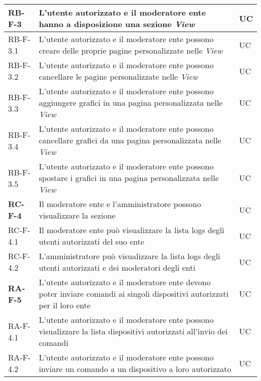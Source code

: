 \begin{center}
\begin{longtable}{|p{3cm}|p{10cm}|p{2cm}|}
		\rowcolor{redroundrobin}
		\textbf{RB-F-3} & L'utente autorizzato e il moderatore ente hanno a disposizione una sezione \textit{View} & UC \\ \hline
		{\color{gray} RB-F-}3.1 & L'utente autorizzato e il moderatore ente possono creare delle proprie pagine personalizzate nelle \textit{View} & UC \\ \hline
		{\color{gray} RB-F-}3.2 & L'utente autorizzato e il moderatore ente possono cancellare le pagine personalizzate nelle \textit{View} & UC \\ \hline
		{\color{gray} RB-F-}3.3 & L'utente autorizzato e il moderatore ente possono aggiungere grafici in una pagina personalizzata nelle \textit{View} & UC \\ \hline
		{\color{gray} RB-F-}3.4 & L'utente autorizzato e il moderatore ente possono cancellare grafici da una pagina personalizzata nelle \textit{View} & UC \\ \hline
		{\color{gray} RB-F-}3.5 & L'utente autorizzato e il moderatore ente possono spostare i grafici in una pagina personalizzata nelle \textit{View} & UC \\ \hline

		\rowcolor{redroundrobin}
		\textbf{RC-F-4} & Il moderatore ente e l'amministratore possono visualizzare la sezione \glock{Logs} & UC \\ \hline
		{\color{gray} RC-F-}4.1 & Il moderatore ente può visualizzare la lista logs degli utenti autorizzati del suo ente & UC \\ \hline
		{\color{gray} RC-F-}4.2 & L'amministratore può visualizzare la lista logs degli utenti autorizzati e dei moderatori degli enti & UC \\ \hline

		\rowcolor{redroundrobin}
		\textbf{RA-F-5} & L'utente autorizzato e il moderatore ente devono poter inviare comandi ai singoli dispositivi autorizzati per il loro ente & UC \\ \hline
		{\color{gray} RA-F-}4.1 & L'utente autorizzato e il moderatore ente possono visualizzare la lista dispositivi autorizzati all'invio dei comandi & UC \\ \hline
		{\color{gray} RA-F-}4.2 & L'utente autorizzato e il moderatore ente possono inviare un comando a un dispositivo a loro autorizzato & UC \\ \hline


\end{longtable}
\end{center}
